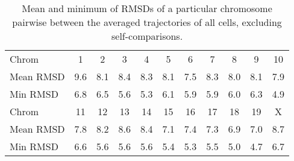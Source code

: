 \begin{table}[ht]
\centering
  \caption{Mean and minimum of RMSDs of a particular chromosome pairwise between the averaged trajectories of all cells, excluding self-comparisons.}
  \label{tab:mean_chrom_cross_rmsd}
  \begin{tabular}{l @{\phantom{abc}} S S S S S S S S S S}
  \toprule
    Chrom & {1} & {2} & {3} & {4} & {5} & {6} & {7} & {8} & {9} & {10} \\
    Mean RMSD & 9.6 & 8.1 & 8.4 & 8.3 & 8.1 & 7.5 & 8.3 & 8.0 & 8.1 & 7.9 \\
    Min RMSD  & 6.8 & 6.5 & 5.6 & 5.3 & 6.1 & 5.9 & 5.9 & 6.0 & 6.3 & 4.9 \\
  \midrule
    Chrom & {11} & {12} & {13} & {14} & {15} & {16} & {17} & {18} & {19} & {X} \\
    Mean RMSD & 7.8 & 8.2 & 8.6 & 8.4 & 7.1 & 7.4 & 7.3 & 6.9 & 7.0 & 8.7 \\
    Min RMSD  & 6.6 & 5.6 & 5.6 & 5.6 & 5.4 & 5.3 & 5.5 & 5.0 & 4.7 & 6.7 \\
  \bottomrule
  \end{tabular}
\end{table}


